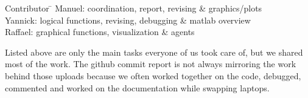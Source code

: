 
\begin{tabbing}
Contributor \= \kill
Manuel: \> coordination, report, revising \& graphics/plots \\
Yannick: \> logical functions, revising, debugging \& matlab overview \\
Raffael: \> graphical functions, visualization \& agents \\
\end{tabbing}

\noi Listed above are only the main tasks everyone of us took care of, but we shared most of the work. The github commit report is not always mirroring the work behind those uploads because we often worked together on the code, debugged, commented and worked on the documentation while swapping laptops.
